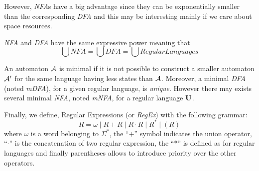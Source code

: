However, \textit{NFA}s have a big advantage since they can be exponentially smaller than the corresponding \textit{DFA} and this may be interesting mainly if we care about space resources.

\begin{remark}
  \textit{NFA} and \textit{DFA} have the same expressive power meaning that \[\bigcup NFA = \bigcup DFA = \bigcup RegularLanguages\]
\end{remark}

\begin{definition}
  \label{lemma:minimalAut}
  An automaton $\mathcal{A}$ is minimal if it is not possible to construct a smaller automaton $\mathcal{A}'$ for the same language having less states than $\mathcal{A}$. Moreover, a minimal \textit{DFA} (noted \textit{mDFA}), for a given regular language, is \textit{unique}. However there may exists several minimal \textit{NFA}, noted \textit{mNFA}, for a regular language $\mathbf{U}$.
\end{definition}

Finally, we define, Regular Expressions (or \textit{RegEx}) with the following grammar:
\[R = \omega \mid R + R \mid R \cdot R \mid R^* \mid (R)\]
where $\omega$ is a word belonging to $\Sigma^*$, the ``$+$'' symbol indicates the union operator, ``$\cdot$'' is the concatenation of two regular expression, the ``$*$'' is defined as for regular languages and finally parentheses allows to introduce priority over the other operators.

